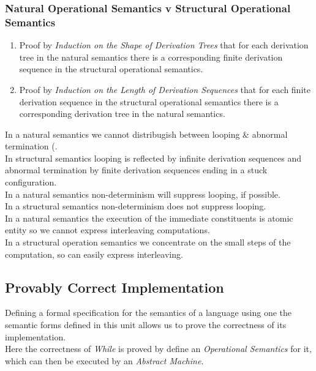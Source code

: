 \documentclass[11pt,a4paper]{article}
\begin{document}
\subsubsection{Natural Operational Semantics v Structural Operational Semantics}

\begin{enumerate}[label=\roman*)]
	\item Proof by \textit{Induction on the Shape of Derivation Trees} that for each derivation tree in the natural semantics there is a corresponding finite derivation sequence in the structural operational semantics.
	\item Proof by \textit{Induction on the Length of Derivation Sequences} that for each finite derivation sequence in the structural operational semantics there is a corresponding derivation tree in the natural semantics.
\end{enumerate}

In a natural semantics we cannot distribugish between looping \& abnormal termination (.\\
In structural semantics looping is reflected by infinite derivation sequences and abnormal termination by finite derivation sequences ending in a stuck configuration.\\

In a natural semantics non-determinism will suppress looping, if possible.\\
In a structural semantics non-determinism does not suppress looping.\\

In a natural semantics the execution of the immediate constituents is atomic entity so we cannot express interleaving computations.\\
In a structural operation semantics we concentrate on the small steps of the computation, so can easily express interleaving.

\subsection{Provably Correct Implementation}

Defining a formal specification for the semantics of a language using one the semantic forms defined in this unit allows us to prove the correctness of its implementation.\\
Here the correctness of \textit{While} is proved by define an \textit{Operational Semantics} for it, which can then be executed by an \textit{Abstract Machine}.\\
\end{document}
